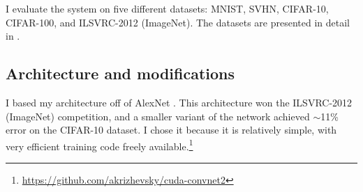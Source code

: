 I evaluate the system on five different datasets:
MNIST, SVHN, CIFAR-10, CIFAR-100, and ILSVRC-2012 (ImageNet).
The datasets are presented in detail in .


\subsection{Architecture and modifications}

I based my architecture off of AlexNet \textcite{Krizhevsky2012}.
This architecture won the ILSVRC-2012 (ImageNet) competition,
and a smaller variant of the network achieved $\sim$11\% error on the CIFAR-10 dataset.
I chose it because it is relatively simple,
with very efficient training code freely available.\footnote{
  \url{https://github.com/akrizhevsky/cuda-convnet2}}

